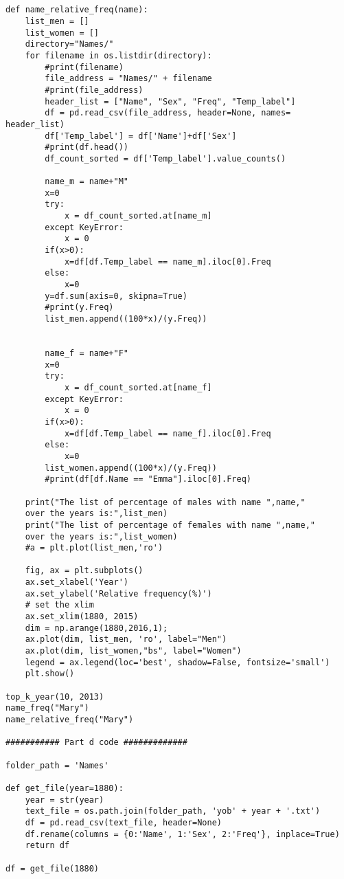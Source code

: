 \documentclass[12pt]{article}%
\begin{document}
\begin{lstlisting}
    
    
def name_relative_freq(name):
    list_men = []
    list_women = []
    directory="Names/"
    for filename in os.listdir(directory):
        #print(filename)
        file_address = "Names/" + filename
        #print(file_address)
        header_list = ["Name", "Sex", "Freq", "Temp_label"]
        df = pd.read_csv(file_address, header=None, names= header_list)
        df['Temp_label'] = df['Name']+df['Sex']
        #print(df.head())
        df_count_sorted = df['Temp_label'].value_counts()
        
        name_m = name+"M"
        x=0
        try:
            x = df_count_sorted.at[name_m]
        except KeyError:
            x = 0
        if(x>0):
            x=df[df.Temp_label == name_m].iloc[0].Freq
        else:
            x=0
        y=df.sum(axis=0, skipna=True)
        #print(y.Freq)
        list_men.append((100*x)/(y.Freq))
        
        
        name_f = name+"F"
        x=0
        try:
            x = df_count_sorted.at[name_f]
        except KeyError:
            x = 0
        if(x>0):
            x=df[df.Temp_label == name_f].iloc[0].Freq
        else:
            x=0
        list_women.append((100*x)/(y.Freq))
        #print(df[df.Name == "Emma"].iloc[0].Freq)
        
    print("The list of percentage of males with name ",name," 
    over the years is:",list_men)
    print("The list of percentage of females with name ",name," 
    over the years is:",list_women)
    #a = plt.plot(list_men,'ro')
    
    fig, ax = plt.subplots()
    ax.set_xlabel('Year') 
    ax.set_ylabel('Relative frequency(%)')
    # set the xlim
    ax.set_xlim(1880, 2015)
    dim = np.arange(1880,2016,1);
    ax.plot(dim, list_men, 'ro', label="Men") 
    ax.plot(dim, list_women,"bs", label="Women")
    legend = ax.legend(loc='best', shadow=False, fontsize='small')
    plt.show()
    
top_k_year(10, 2013)
name_freq("Mary")
name_relative_freq("Mary")

########### Part d code #############

folder_path = 'Names'

def get_file(year=1880):
    year = str(year)
    text_file = os.path.join(folder_path, 'yob' + year + '.txt')
    df = pd.read_csv(text_file, header=None)
    df.rename(columns = {0:'Name', 1:'Sex', 2:'Freq'}, inplace=True)
    return df

df = get_file(1880)



\end{lstlisting}
\end{document}
